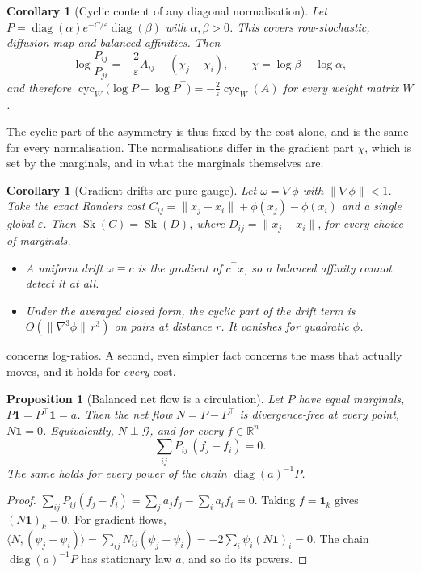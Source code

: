 \documentclass{article}
\theoremstyle{plain}
\newtheorem{proposition}[theorem]{Proposition}
\newtheorem{corollary}[theorem]{Corollary}
\theoremstyle{definition}
\theoremstyle{remark}
\newcommand{\R}{\mathbb{R}}
\newcommand{\eps}{\varepsilon}
\newcommand{\1}{\mathbf{1}}
\newcommand{\diag}{\operatorname{diag}}
\newcommand{\Grad}{\mathcal{G}}
\newcommand{\cyc}{\operatorname{cyc}}
\newcommand{\Sk}{\operatorname{Sk}}
\begin{document}
\begin{corollary}[Cyclic content of any diagonal normalisation]
  \label{cor:cyclic}
  Let $P=\diag(\alpha)e^{-C/\eps}\diag(\beta)$ with $\alpha,\beta>0$. This
  covers row-stochastic, diffusion-map and balanced affinities. Then
  \[
    \log\frac{P_{ij}}{P_{ji}}=-\frac{2}{\eps}A_{ij}+(\chi_j-\chi_i),
    \qquad \chi=\log\beta-\log\alpha ,
  \]
  and therefore $\cyc_W\!\big(\log P-\log P^\top\big)=-\tfrac{2}{\eps}\cyc_W(A)$
  for every weight matrix $W$.
\end{corollary}

The cyclic part of the asymmetry is thus fixed by the cost alone, and is
the same for every normalisation. The normalisations differ in the gradient
part $\chi$, which is set by the marginals, and in what the marginals
themselves are.

\begin{corollary}[Gradient drifts are pure gauge]
  \label{cor:gauge}
  Let $\omega=\nabla\phi$ with $\|\nabla\phi\|<1$. Take the exact Randers
  cost $C_{ij}=\|x_j-x_i\|+\phi(x_j)-\phi(x_i)$ and a single global $\eps$.
  Then $\Sk(C)=\Sk(D)$, where $D_{ij}=\|x_j-x_i\|$, for every choice of
  marginals.
  \begin{itemize}
    \item A \emph{uniform} drift $\omega\equiv c$ is the gradient of
      $c^\top x$, so a balanced affinity cannot detect it at all.
    \item Under the averaged closed form, the cyclic part of the drift term
      is $O(\|\nabla^3\phi\|\,r^3)$ on pairs at distance $r$. It vanishes
      for quadratic $\phi$.
  \end{itemize}
\end{corollary}

 concerns log-ratios. A second, even simpler
fact concerns the mass that actually moves, and it holds for \emph{every}
cost.

\begin{proposition}[Balanced net flow is a circulation]
  \label{prop:netflow}
  Let $P$ have equal marginals, $P\1=P^\top\1=a$. Then the net flow
  $N=P-P^\top$ is divergence-free at every point, $N\1=0$. Equivalently,
  $N\perp\Grad$, and for every $f\in\R^n$
  \[
    \textstyle\sum_{ij}P_{ij}\,(f_j-f_i)=0 .
  \]
  The same holds for every power of the chain $\diag(a)^{-1}P$.
\end{proposition}

\begin{proof}
  $\sum_{ij}P_{ij}(f_j-f_i)=\sum_ja_jf_j-\sum_ia_if_i=0$. Taking
  $f=\1_k$ gives $(N\1)_k=0$. For gradient flows,
  $\langle N,(\psi_j-\psi_i)\rangle=\sum_{ij}N_{ij}(\psi_j-\psi_i)=-2\sum_i\psi_i(N\1)_i=0$.
  The chain $\diag(a)^{-1}P$ has stationary law $a$, and so do its powers.
\end{proof}
\end{document}
